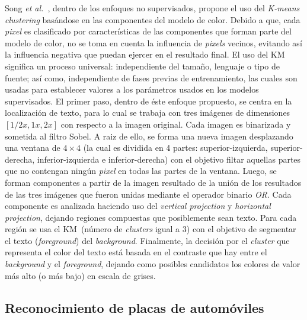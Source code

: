 Song \textit{et al.}~\cite{Song:2008:ITEbasedKMC}, dentro de los enfoques no
supervisados, propone el uso del \textit{K-means clustering} basándose en las
componentes del modelo de color. Debido a que, cada \textit{pixel} es
clasificado por características de las componentes que forman parte del modelo
de color, no se toma en cuenta la influencia de \textit{pixels} vecinos,
evitando así la influencia negativa que puedan ejercer en el resultado final. El
uso del KM significa un proceso universal: independiente del tamaño, lenguaje o
tipo de fuente; así como, independiente de fases previas de entrenamiento, las
cuales son usadas para establecer valores a los parámetros usados en los modelos
supervisados. El primer paso, dentro de éste enfoque propuesto, se centra en la
localización de texto, para lo cual se trabaja con tres imágenes de dimensiones
$[1/2 x, 1x, 2x]$ con respecto a la imagen original. Cada imagen es binarizada y
sometida al filtro Sobel. A raiz de ello, se forma una nueva imagen desplazando
una ventana de $4 \times 4$ (la cual es dividida en 4 partes:
superior-izquierda, superior-derecha, inferior-izquierda e inferior-derecha) con
el objetivo filtar aquellas partes que no contengan ningún \textit{pixel} en
todas las partes de la ventana. Luego, se forman componentes a partir de la
imagen resultado de la unión de los resultados de las tres imágenes que fueron
unidas mediante el operador binario \textit{OR}. Cada componente es analizada
haciendo uso del \textit{vertical projection} y \textit{horizontal projection},
dejando regiones compuestas que posiblemente sean texto. Para cada región se usa
el KM~(número de \textit{clusters} igual a $3$) con el objetivo de segmentar el
texto (\textit{foreground}) del \textit{background}. Finalmente, la decisión por
el \textit{cluster} que representa el color del texto está basada en el
contraste que hay entre el \textit{background} y el \textit{foreground}, dejando
como posibles candidatos los colores de valor más alto (o más bajo) en escala de
grises.

\subsection{Reconocimiento de placas de automóviles}

